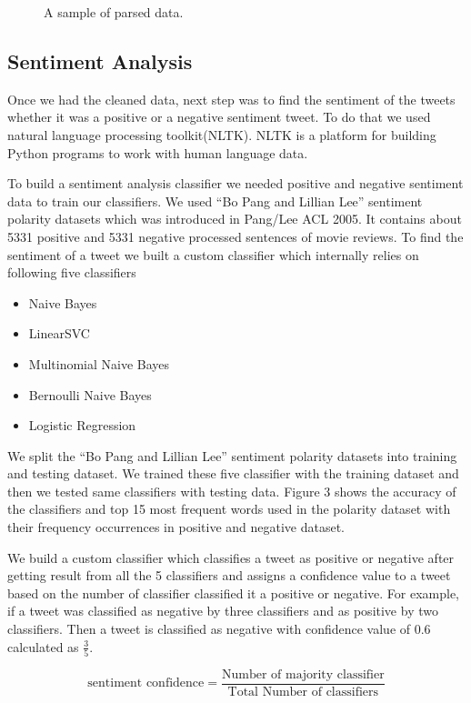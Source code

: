 \documentclass{acm_proc_article-sp}
\begin{document}
\begin{figure}
\centering
{}
\caption{A sample of parsed data.}
\end{figure}

\subsection{Sentiment Analysis}
Once we had the cleaned data, next step was to find the sentiment of the tweets whether it was a positive or a negative sentiment tweet. To do that we used natural language processing toolkit(NLTK). NLTK is a platform for building Python programs to work with human language data.\cite{nltk:nltkdoc}

To build a sentiment analysis classifier we needed positive and negative sentiment data to train our classifiers. We used  ``Bo Pang and Lillian Lee'' sentiment polarity datasets which was introduced in Pang/Lee ACL 2005.\cite{pang:spdmrd} It contains about 5331 positive and 5331 negative processed sentences of movie reviews.
To find the sentiment of a tweet we built a custom classifier which internally relies on following five classifiers
\begin{itemize}
\item Naive Bayes
\item LinearSVC
\item Multinomial Naive Bayes
\item Bernoulli Naive Bayes
\item Logistic Regression
\end{itemize}
We split the ``Bo Pang and Lillian Lee'' sentiment polarity datasets into training and testing dataset. We trained these five classifier with the training dataset and then we tested same classifiers with testing data. Figure 3 shows the accuracy of the classifiers and top 15 most frequent words used in the polarity dataset with their frequency occurrences in positive and negative dataset.

We build a custom classifier which classifies a tweet as positive or negative after getting result from all the 5 classifiers and assigns a confidence value to a tweet based on the number of classifier classified it a positive or negative. For example, if a tweet was classified as negative by three classifiers and as positive by two classifiers. Then a tweet is classified as negative with confidence value of $0.6$ calculated as $\frac{3}{5}$.

\begin{displaymath}
 \text{sentiment confidence} = \frac{\text{Number of majority classifier}}{\text{Total Number of classifiers}}
\end{displaymath}
\end{document}
